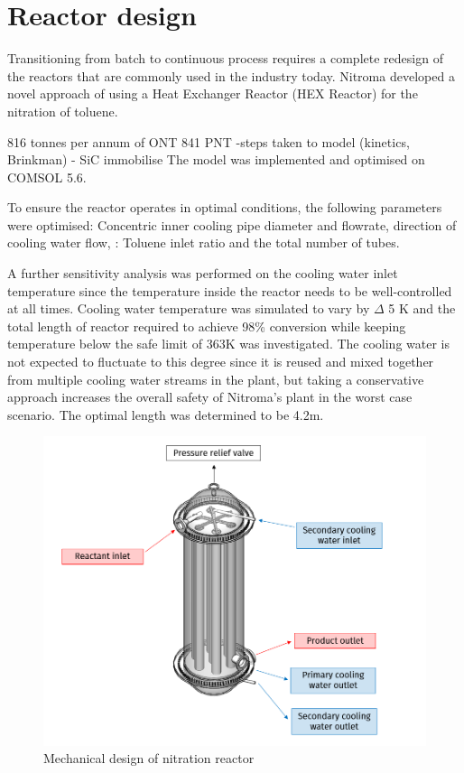 \section*{Reactor design}


Transitioning from batch to continuous process requires a complete redesign of the reactors that are commonly used in the industry today. Nitroma developed a novel approach of using a Heat Exchanger Reactor (HEX Reactor) for the nitration of toluene.

816 tonnes per annum of ONT 841 PNT
-steps taken to model (kinetics, Brinkman) 
- SiC immobilise
The model was implemented and optimised on COMSOL 5.6. 

To ensure the reactor operates in optimal conditions, the following parameters were optimised: Concentric inner cooling pipe diameter and flowrate, direction of cooling water flow,  : Toluene inlet ratio and the total number of tubes.

A further sensitivity analysis was performed on the cooling water inlet temperature since the temperature inside the reactor needs to be well-controlled at all times. Cooling water temperature was simulated to vary by \mypm $\Delta$ 5 K and the total length of reactor required to achieve 98\% conversion while keeping temperature below the safe limit of 363K was investigated. The cooling water is not expected to fluctuate to this degree since it is reused and mixed together from multiple cooling water streams in the plant, but taking a conservative approach increases the overall safety of Nitroma's plant in the worst case scenario. The optimal length was determined to be 4.2m. 



\begin{figure}[h]
    \centering
    \includegraphics[width=0.7\linewidth]{chapters/0-executive-summary/figures/FYD executive sum.PNG}
    \caption{Mechanical design of nitration reactor}
    \label{fig:executivesummaryreactor}
\end{figure}